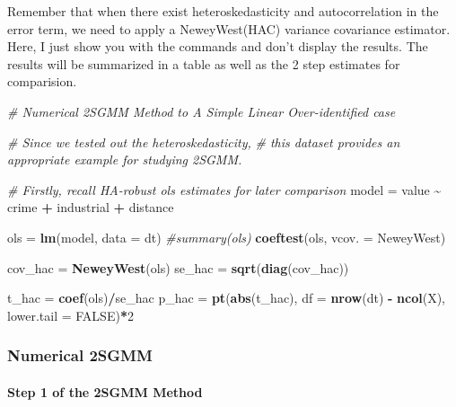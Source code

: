 \documentclass[
  12pt,
]{article}
\newenvironment{Shaded}{\begin{snugshade}}{\end{snugshade}}
\newcommand{\CommentTok}[1]{\textcolor[rgb]{0.56,0.35,0.01}{\textit{#1}}}
\newcommand{\DataTypeTok}[1]{\textcolor[rgb]{0.13,0.29,0.53}{#1}}
\newcommand{\DecValTok}[1]{\textcolor[rgb]{0.00,0.00,0.81}{#1}}
\newcommand{\KeywordTok}[1]{\textcolor[rgb]{0.13,0.29,0.53}{\textbf{#1}}}
\newcommand{\NormalTok}[1]{#1}
\newcommand{\OperatorTok}[1]{\textcolor[rgb]{0.81,0.36,0.00}{\textbf{#1}}}
\newcommand{\OtherTok}[1]{\textcolor[rgb]{0.56,0.35,0.01}{#1}}
\newcommand{\StringTok}[1]{\textcolor[rgb]{0.31,0.60,0.02}{#1}}
\begin{document}
Remember that when there exist heteroskedasticity and autocorrelation in the error term, we need to apply a NeweyWest(HAC) variance covariance estimator. Here, I just show you with the commands and don't display the results. The results will be summarized in a table as well as the 2 step estimates for comparision.

\begin{Shaded}
\begin{Highlighting}[]
\CommentTok{\# Numerical 2SGMM Method to A Simple Linear Over{-}identified case}

\CommentTok{\# Since we tested out the heteroskedasticity, }
\CommentTok{\# this dataset provides an appropriate example for studying 2SGMM.}


\CommentTok{\# Firstly, recall HA{-}robust ols estimates for later comparison}
\NormalTok{model =}\StringTok{ }\NormalTok{value }\OperatorTok{\textasciitilde{}}\StringTok{ }\NormalTok{crime }\OperatorTok{+}\StringTok{ }\NormalTok{industrial }\OperatorTok{+}\StringTok{ }\NormalTok{distance}

\NormalTok{ols =}\StringTok{ }\KeywordTok{lm}\NormalTok{(model, }\DataTypeTok{data =}\NormalTok{ dt)}
\CommentTok{\#summary(ols)}
\KeywordTok{coeftest}\NormalTok{(ols, }\DataTypeTok{vcov. =}\NormalTok{ NeweyWest)}

\NormalTok{cov\_hac =}\StringTok{ }\KeywordTok{NeweyWest}\NormalTok{(ols)}
\NormalTok{se\_hac =}\StringTok{ }\KeywordTok{sqrt}\NormalTok{(}\KeywordTok{diag}\NormalTok{(cov\_hac))}

\NormalTok{t\_hac =}\StringTok{ }\KeywordTok{coef}\NormalTok{(ols)}\OperatorTok{/}\NormalTok{se\_hac}
\NormalTok{p\_hac =}\StringTok{ }\KeywordTok{pt}\NormalTok{(}\KeywordTok{abs}\NormalTok{(t\_hac), }\DataTypeTok{df =} \KeywordTok{nrow}\NormalTok{(dt) }\OperatorTok{{-}}\StringTok{ }\KeywordTok{ncol}\NormalTok{(X), }\DataTypeTok{lower.tail =} \OtherTok{FALSE}\NormalTok{)}\OperatorTok{*}\DecValTok{2}   
\end{Highlighting}
\end{Shaded}

\hypertarget{numerical-2sgmm}{%
\subsubsection{Numerical 2SGMM}\label{numerical-2sgmm}}

\hypertarget{step-1-of-the-2sgmm-method}{%
\paragraph{Step 1 of the 2SGMM Method}\label{step-1-of-the-2sgmm-method}}
\end{document}
